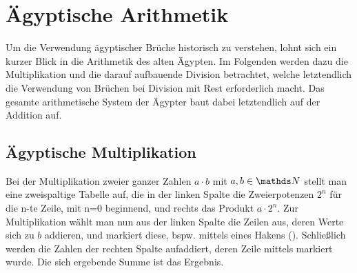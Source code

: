 \section{Ägyptische Arithmetik}
	Um die Verwendung ägyptischer Brüche historisch zu verstehen, lohnt sich ein kurzer Blick in die Arithmetik des alten Ägypten. Im Folgenden werden dazu die Multiplikation und die darauf aufbauende Division betrachtet, welche letztendlich die Verwendung von Brüchen bei Division mit Rest erforderlich macht. Das gesamte arithmetische System der Ägypter baut dabei letztendlich auf der Addition auf.

\subsection{Ägyptische Multiplikation}\label{subsec:egypMult}
	Bei der Multiplikation zweier ganzer Zahlen $a \cdot b$ mit $a, b \in \N$ stellt man eine zweispaltige Tabelle auf, die in der linken Spalte die Zweierpotenzen $2^{n}$ für die n-te Zeile, mit n=0 beginnend, und rechts das Produkt $a \cdot 2^n$.
	Zur Multiplikation wählt man nun aus der linken Spalte die Zeilen aus, deren Werte sich zu $b$ addieren, und markiert diese, bspw. mittels eines Hakens (\checkmark). Schließlich werden die Zahlen der rechten Spalte aufaddiert, deren Zeile mittels \checkmark markiert wurde. Die sich ergebende Summe ist das Ergebnis.
	
